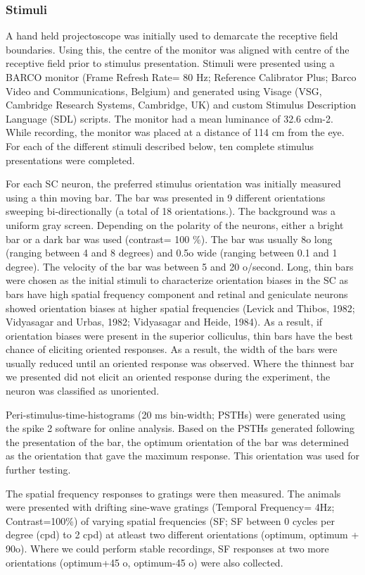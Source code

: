 	\subsubsection{Stimuli}
	A hand held projectoscope was initially used to demarcate the receptive field boundaries. Using this, the centre of the monitor was aligned with centre of the receptive field prior to stimulus presentation. Stimuli were presented using a BARCO monitor (Frame Refresh Rate= 80 Hz; Reference Calibrator Plus; Barco Video and Communications, Belgium) and generated using Visage (VSG, Cambridge Research Systems, Cambridge, UK) and custom Stimulus Description Language (SDL) scripts. The monitor had a mean luminance of 32.6 cdm-2. While recording, the monitor was placed at a distance of 114 cm from the eye. For each of the different stimuli described below, ten complete stimulus presentations were completed.

	For each SC neuron, the preferred stimulus orientation was initially measured using a thin moving bar. The bar was presented in 9 different orientations sweeping bi-directionally (a total of 18 orientations.). The background was a uniform gray screen. Depending on the polarity of the neurons, either a bright bar or a dark bar was used (contrast= 100 \%). The bar was usually 8o long (ranging between 4 and 8 degrees) and 0.5o wide (ranging between 0.1 and 1 degree). The velocity of the bar was between 5 and 20 o/second. Long, thin bars were chosen as the initial stimuli to characterize orientation biases in the SC as bars have high spatial frequency component and retinal and geniculate neurons showed orientation biases at higher spatial frequencies (Levick and Thibos, 1982; Vidyasagar and Urbas, 1982; Vidyasagar and Heide, 1984). As a result, if orientation biases were present in the superior colliculus, thin bars have the best chance of eliciting oriented responses. As a result, the width of the bars were usually reduced until an oriented response was observed. Where the thinnest bar we presented did not elicit an oriented response during the experiment, the neuron was classified as unoriented.
	
	Peri-stimulus-time-histograms (20 ms bin-width; PSTHs) were generated using the spike 2 software for online analysis. Based on the PSTHs generated following the presentation of the bar, the optimum orientation of the bar was determined as the orientation that gave the maximum response. This orientation was used for further testing.
	
	The spatial frequency responses to gratings were then measured. The animals were presented with drifting sine-wave gratings (Temporal Frequency= 4Hz; Contrast=100\%) of varying spatial frequencies (SF; SF between 0 cycles per degree (cpd) to 2 cpd) at atleast two different orientations (optimum, optimum + 90o). Where we could perform stable recordings, SF responses at two more orientations (optimum+45 o, optimum-45 o) were also collected. 

